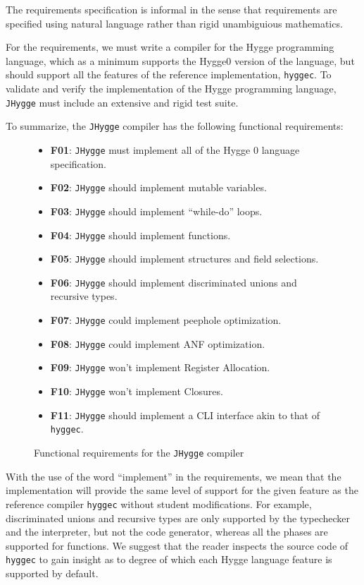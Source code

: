 The requirements specification is informal in the sense that requirements are specified using natural language rather than rigid unambiguious mathematics.

For the requirements, we must write a compiler for the Hygge programming language, which as a minimum supports the Hygge0 version of the language,
but should support all the features of the reference implementation, \texttt{hyggec}.
To validate and verify the implementation of the Hygge programming language, \texttt{JHygge} must include an extensive and rigid test suite.

To summarize, the \texttt{JHygge} compiler has the following functional requirements:

\begin{figure}[H]
\centering  
\begin{itemize}
  \item \textbf{F01}: \texttt{JHygge} must implement all of the Hygge 0 language specification.
  \item \textbf{F02}: \texttt{JHygge} should implement mutable variables.
  \item \textbf{F03}: \texttt{JHygge} should implement ``while-do'' loops.
  \item \textbf{F04}: \texttt{JHygge} should implement functions.
  \item \textbf{F05}: \texttt{JHygge} should implement structures and field selections.
  \item \textbf{F06}: \texttt{JHygge} should implement discriminated unions and recursive types.
  \item \textbf{F07}: \texttt{JHygge} could implement peephole optimization.
  \item \textbf{F08}: \texttt{JHygge} could implement ANF optimization.
  \item \textbf{F09}: \texttt{JHygge} won't implement Register Allocation.
  \item \textbf{F10}: \texttt{JHygge} won't implement Closures.
  \item \textbf{F11}: \texttt{JHygge} should implement a CLI interface akin to that of \texttt{hyggec}.
\end{itemize}
\caption{Functional requirements for the \texttt{JHygge} compiler}
\label{fig:functional_requirements}
\end{figure}

With the use of the word ``implement'' in the requirements, we mean that the implementation will provide the same level of support
for the given feature as the reference compiler \texttt{hyggec} without student modifications. For example, discriminated unions
and recursive types are only supported by the typechecker and the interpreter, but not the code generator, whereas all the phases
are supported for functions. We suggest that the reader inspects the source code of \texttt{hyggec} to gain insight as to
degree of which each Hygge language feature is supported by default.

